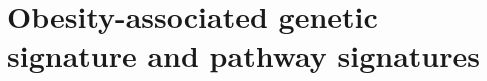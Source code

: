 \chapter{Obesity-associated genetic signature and pathway signatures}
\label{cha:obesity_associated_genetic_signature_and_pathway_signatures}


